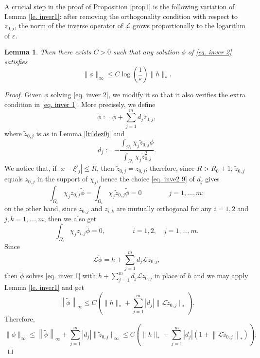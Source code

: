 \documentclass[11pt]{article}
\newtheorem{lemma}{Lemma}[section]
\begin{document}
A crucial step in the proof of Proposition \ref{prop1} is the following variation of Lemma \ref{le. inver1}: after removing the orthogonality condition with respect to $z_{0,j}$, the norm of the inverse operator of $\mathcal L$ grows proportionally to the logarithm of $\varepsilon$.

\begin{lemma}\label{le. inver2}
Then there exists $C>0$ such that any solution $\phi$ of \eqref{eq. inver 2} satisfies
$$\|\phi\|_\infty\le C\log\left(\frac1\varepsilon\right)\|h\|_\ast.$$
\end{lemma}

\begin{proof}
Given $\phi$ solving \eqref{eq. inver 2}, we modify it so that it also verifies the extra condition in \eqref{eq. inver 1}. More precisely, we define
$$\widetilde\phi:=\phi+\sum_{j=1}^md_j\widetilde z_{0,j},$$
where $\widetilde z_{0,j}$ is as in Lemma \ref{ltildez0j} and
\begin{equation}\label{eq. inve2 9}
d_j:=-\frac{\int_{\Omega_\varepsilon}\chi_j\widetilde z_{0,j}\phi}{\int_{\Omega_\varepsilon}\chi_j\widetilde z_{0,j}^2}.
\end{equation}
We notice that, if $\left|x-\xi'_j\right|\le R$, then $\widetilde z_{0,j}=z_{0,j}$; therefore, since $R>R_0+1$, $\widetilde z_{0,j}$ equals $z_{0,j}$ in the support of $\chi_j$, hence the choice \eqref{eq. inve2 9} of $d_j$ gives
$$\int_{\Omega_\varepsilon}\chi_jz_{0,j}\widetilde\phi=\int_{\Omega_\varepsilon}\chi_j\widetilde z_{0,j}\widetilde\phi=0\qquad\qquad j=1,\dots,m;$$
on the other hand, since $z_{0,j}$ and $z_{i,k}$ are mutually orthogonal for any $i=1,2$ and $j,k=1,\dots,m$, then we also get
$$\int_{\Omega_\varepsilon}\chi_jz_{i,j}\widetilde\phi=0,\qquad\qquad i=1,2,\quad j=1,\dots,m.$$
Since
\begin{equation}\label{ltildephi}
\mathcal L\widetilde\phi=h+\sum_{j=1}^md_j\mathcal L\widetilde z_{0,j},
\end{equation}
then $\widetilde\phi$ solves \eqref{eq. inver 1} with $h+\sum_{j=1}^md_j\mathcal L\widetilde z_{0,j}$ in place of $h$ and we may apply Lemma \ref{le. inver1} and get
\begin{equation}\label{eq. inver 11}
\left\|\widetilde\phi\right\|_\infty\le C\left(\|h\|_\ast+\sum_{j=1}^m|d_j|\|\mathcal L\widetilde z_{0,j}\|_\ast\right).
\end{equation}
Therefore,
$$\|\phi\|_\infty\le\left\|\widetilde\phi\right\|_\infty+\sum_{j=1}^m|d_j|\|\widetilde z_{0,j}\|_\infty\le C\left(\|h\|_\ast+\sum_{j=1}^m|d_j|\left(1+\left\|\mathcal L\widetilde z_{0,j}\right\|_\ast\right)\right);$$

\end{proof}
\end{document}
